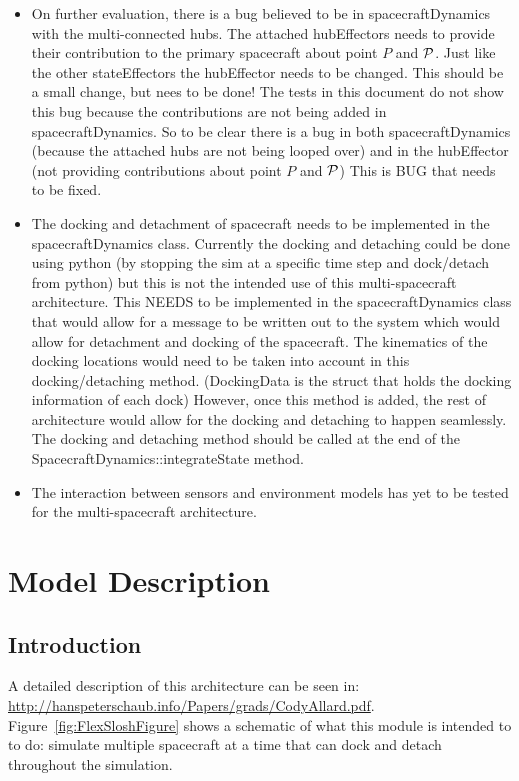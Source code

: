 \begin{itemize}
\item On further evaluation, there is a bug believed to be in spacecraftDynamics with the multi-connected hubs. The attached hubEffectors needs to provide their contribution to the primary spacecraft about point $P$ and $\cal P$. Just like the other stateEffectors the hubEffector needs to be changed. This should be a small change, but nees to be done! The tests in this document do not show this bug because the contributions are not being added in spacecraftDynamics. So to be clear there is a bug in both spacecraftDynamics (because the attached hubs are not being looped over) and in the hubEffector (not providing contributions about point $P$ and $\cal P$) This is BUG that needs to be fixed.
 
\item The docking and detachment of spacecraft needs to be implemented in the spacecraftDynamics class. Currently the docking and detaching could be done using python (by stopping the sim at a specific time step and dock/detach from python) but this is not the intended use of this multi-spacecraft architecture. This NEEDS to be implemented in the spacecraftDynamics class that would allow for a message to be written out to the system which would allow for detachment and docking of the spacecraft. The kinematics of the docking locations would need to be taken into account in this docking/detaching method. (DockingData is the struct that holds the docking information of each dock) However, once this method is added, the rest of architecture would allow for the docking and detaching to happen seamlessly. The docking and detaching method should be called at the end of the SpacecraftDynamics::integrateState method.

\item The interaction between sensors and environment models has yet to be tested for the multi-spacecraft architecture. 
 
\end{itemize}

\section{Model Description}

\subsection{Introduction}

A detailed description of this architecture can be seen in: \url{http://hanspeterschaub.info/Papers/grads/CodyAllard.pdf}. Figure~\ref{fig:FlexSloshFigure} shows a schematic of what this module is intended to to do: simulate multiple spacecraft at a time that can dock and detach throughout the simulation. 

